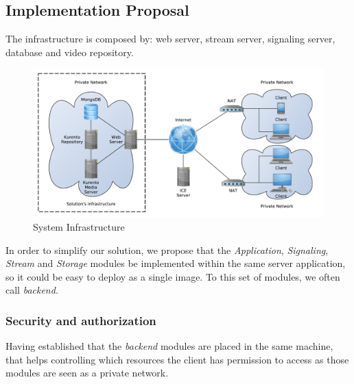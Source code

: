 \documentclass[conference,compsoc,a4paper]{IEEEtran}
\begin{document}


 
\subsection{Implementation Proposal}
The infrastructure is composed by: web server, stream server, signaling server, database and video repository.

\begin{figure}[H]
	\centering
	\includegraphics[width=\linewidth]{figures/infrastructure.pdf}
	\caption{System Infrastructure}
\end{figure}

In order to simplify our solution, we propose that the \emph{Application}, \emph{Signaling}, \emph{Stream} and \emph{Storage} modules be implemented within the same server application, so it could be easy to deploy as a single image. To this set of modules, we often call \emph{backend}.

	\subsubsection{Security and authorization}

Having established that the \emph{backend} modules are placed in the same machine, that helps controlling which resources the client has permission to access as those modules are seen as a private network.
\end{document}

